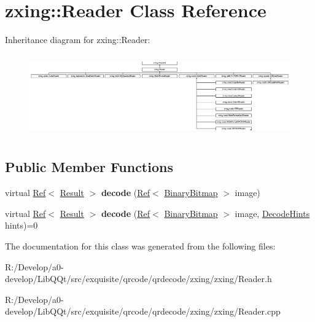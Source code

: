 \hypertarget{classzxing_1_1_reader}{}\section{zxing\+:\+:Reader Class Reference}
\label{classzxing_1_1_reader}
Inheritance diagram for zxing\+:\+:Reader\+:\begin{figure}[H]
\begin{center}
\leavevmode
\includegraphics[height=3.562753cm]{classzxing_1_1_reader}
\end{center}
\end{figure}
\subsection*{Public Member Functions}
\begin{DoxyCompactItemize}
\item 
\mbox{\label{classzxing_1_1_reader_a2af0ac267935d64e8b9bd6fc86d93cca}} 
virtual \mbox{\hyperlink{classzxing_1_1_ref}{Ref}}$<$ \mbox{\hyperlink{classzxing_1_1_result}{Result}} $>$ {\bfseries decode} (\mbox{\hyperlink{classzxing_1_1_ref}{Ref}}$<$ \mbox{\hyperlink{classzxing_1_1_binary_bitmap}{Binary\+Bitmap}} $>$ image)
\item 
\mbox{\label{classzxing_1_1_reader_a3f98ffce536ad7f25ee4c2bfbc370ee4}} 
virtual \mbox{\hyperlink{classzxing_1_1_ref}{Ref}}$<$ \mbox{\hyperlink{classzxing_1_1_result}{Result}} $>$ {\bfseries decode} (\mbox{\hyperlink{classzxing_1_1_ref}{Ref}}$<$ \mbox{\hyperlink{classzxing_1_1_binary_bitmap}{Binary\+Bitmap}} $>$ image, \mbox{\hyperlink{classzxing_1_1_decode_hints}{Decode\+Hints}} hints)=0
\end{DoxyCompactItemize}


The documentation for this class was generated from the following files\+:\begin{DoxyCompactItemize}
\item 
R\+:/\+Develop/a0-\/develop/\+Lib\+Q\+Qt/src/exquisite/qrcode/qrdecode/zxing/zxing/Reader.\+h\item 
R\+:/\+Develop/a0-\/develop/\+Lib\+Q\+Qt/src/exquisite/qrcode/qrdecode/zxing/zxing/Reader.\+cpp\end{DoxyCompactItemize}
